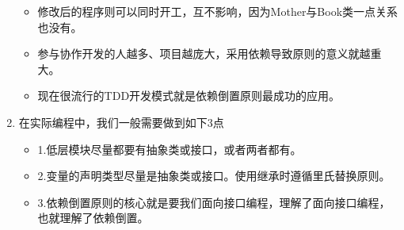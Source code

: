 \documentclass[9pt, b5paper]{article}
\begin{document}
\begin{enumerate}
\begin{itemize}
\item 修改后的程序则可以同时开工，互不影响，因为Mother与Book类一点关系也没有。
\item 参与协作开发的人越多、项目越庞大，采用依赖导致原则的意义就越重大。
\item 现在很流行的TDD开发模式就是依赖倒置原则最成功的应用。
\end{itemize}
\item 在实际编程中，我们一般需要做到如下3点
\label{sec:org5f83d26}
\begin{itemize}
\item 1.低层模块尽量都要有抽象类或接口，或者两者都有。
\item 2.变量的声明类型尽量是抽象类或接口。使用继承时遵循里氏替换原则。
\item 3.依赖倒置原则的核心就是要我们面向接口编程，理解了面向接口编程，也就理解了依赖倒置。
\end{itemize}
\end{enumerate}
\end{document}
